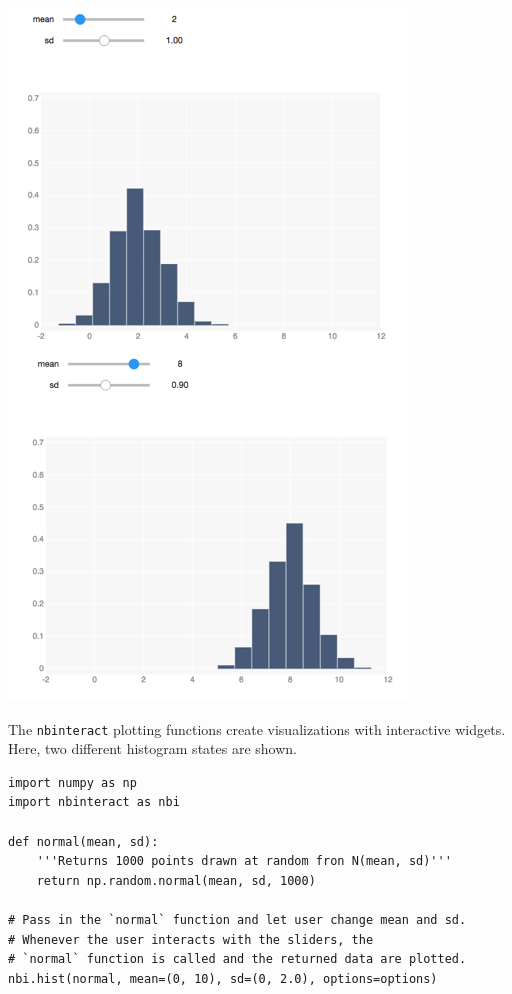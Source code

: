 \documentclass[nobib]{tufte-handout}
\newcommand{\code}[1]{\texttt{#1}}
\begin{document}
\begin{marginfigure}%
  \includegraphics[width=\linewidth]{graphics/nbi-hist.png}
  \caption{The \code{nbinteract} plotting functions create visualizations with
  interactive widgets. Here, two different histogram states are shown.}
  \label{fig:nbi-hist}
\end{marginfigure}

\begin{verbatim}
import numpy as np
import nbinteract as nbi

def normal(mean, sd):
    '''Returns 1000 points drawn at random fron N(mean, sd)'''
    return np.random.normal(mean, sd, 1000)

# Pass in the `normal` function and let user change mean and sd.
# Whenever the user interacts with the sliders, the
# `normal` function is called and the returned data are plotted.
nbi.hist(normal, mean=(0, 10), sd=(0, 2.0), options=options)
\end{verbatim}
\end{document}
